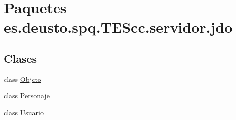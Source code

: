 \hypertarget{namespacees_1_1deusto_1_1spq_1_1_t_e_scc_1_1servidor_1_1jdo}{\section{Paquetes es.\+deusto.\+spq.\+T\+E\+Scc.\+servidor.\+jdo}
\label{namespacees_1_1deusto_1_1spq_1_1_t_e_scc_1_1servidor_1_1jdo}
}
\subsection*{Clases}
\begin{DoxyCompactItemize}
\item 
class \hyperlink{classes_1_1deusto_1_1spq_1_1_t_e_scc_1_1servidor_1_1jdo_1_1_objeto}{Objeto}
\item 
class \hyperlink{classes_1_1deusto_1_1spq_1_1_t_e_scc_1_1servidor_1_1jdo_1_1_personaje}{Personaje}
\item 
class \hyperlink{classes_1_1deusto_1_1spq_1_1_t_e_scc_1_1servidor_1_1jdo_1_1_usuario}{Usuario}
\end{DoxyCompactItemize}
